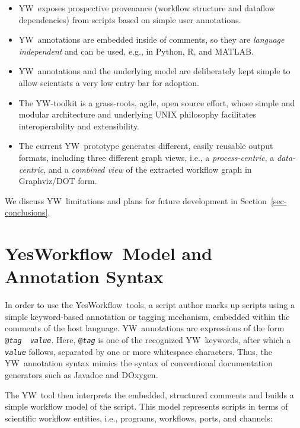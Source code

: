 \documentclass{article}
\newcommand{\YW}{\textsf{YesWorkflow}}
\newcommand{\yw}{\textsf{YW}}
\newcommand{\YWT}{\textsf{YesWorkflow}}
\newcommand{\ywa}[1]{\texttt{#1}}
\newcommand{\R}{\textsf{R}}
\newcommand{\MATLAB}{\textsf{MATLAB}}
\begin{document}
\begin{itemize}

\item \yw\ exposes prospective provenance (workflow structure and
  dataflow dependencies) from scripts based on simple user annotations.

\item \yw\ annotations are embedded inside of comments, so they
  are \emph{language independent} and can be used, e.g., in Python, \R,
  and \MATLAB.

\item \yw\ annotations and the underlying model are deliberately kept
  simple to allow scientists a very low entry bar for adoption.

\item The \yw-toolkit is a grass-roots, agile, open source effort, whose
 simple and modular architecture and underlying UNIX philosophy
 facilitates interoperability and extensibility.

\item The current \yw\ prototype generates different, easily reusable
  output formats, including three different graph views, i.e., a
  \emph{process-centric}, a \emph{data-centric}, and a \emph{combined
    view} of the extracted workflow graph in Graphviz/DOT form.

 \end{itemize}

 \noindent We discuss \yw\ limitations and plans for future
 development in Section~\ref{sec-conclusions}.


\section{\YWT\ Model and Annotation Syntax}\label{sec-ywmodel}

In order to use the \YW\ tools, a script author marks up scripts using
a simple keyword-based annotation or tagging mechanism, embedded
within the comments of the host language. \yw\ annotations are
expressions of the form
\ywa{@\emph{tag}}~\textvisiblespace~\ywa{\emph{value}}. Here,
\ywa{@\emph{tag}} is one of the recognized \yw\ keywords, after which a
\ywa{\emph{value}} follows, separated by one or more whitespace
characters. Thus, the \yw\ annotation syntax mimics the syntax of
conventional documentation generators such as Javadoc and DOxygen.

The \yw\ tool then interprets the embedded, structured comments and
builds a simple workflow model of the script. This model represents
scripts in terms of scientific workflow entities, i.e., programs,
workflows, ports, and channels:
\end{document}
